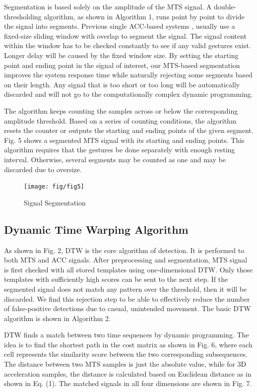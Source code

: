 Segmentation is based solely on the amplitude of the MTS
signal. A double-thresholding algorithm, as shown in Algorithm
1, runs point by point to divide the signal into segments.
Previous single ACC-based systems \cite{c13}, \cite{c14} usually use a
fixed-size sliding window with overlap to segment the signal.
The signal content within the window has to be checked
constantly to see if any valid gestures exist. Longer delay will
be caused by the fixed window size. By setting the starting
point and ending point in the signal of interest, our MTS-based
segmentation improves the system response time while
naturally rejecting some segments based on their length. Any
signal that is too short or too long will be automatically
discarded and will not go to the computationally complex
dynamic programming.

The algorithm keeps counting the samples across or below
the corresponding amplitude threshold. Based on a series of
counting conditions, the algorithm resets the counter or outputs
the starting and ending points of the given segment. Fig. 5
shows a segmented MTS signal with its starting and ending
points. This algorithm requires that the gestures be done
separately with enough resting interval. Otherwise, several
segments may be counted as one and may be discarded due to
oversize.

\begin{figure}[t]
\centering
\texttt{[image: fig/fig5]}
\caption{Signal Segmentation}
\end{figure}

\subsection{Dynamic Time Warping Algorithm}
As shown in Fig. 2, DTW is the core algorithm of detection.
It is performed to both MTS and ACC signals. After
preprocessing and segmentation, MTS signal is first checked
with all stored templates using one-dimensional DTW. Only
those templates with sufficiently high scores can be sent to
the next step. If the segmented signal does not match any
pattern over the threshold, then it will be discarded. We find
this rejection step to be able to effectively reduce the number of
false-positive detections due to casual, unintended movement.
The basic DTW algorithm is shown in Algorithm 2.

DTW finds a match between two time sequences by dynamic
programming. The idea is to find the shortest path in the
cost matrix as shown in Fig. 6, where each cell represents the
similarity score between the two corresponding subsequences.
The distance between two MTS samples is just the absolute
value, while for 3D acceleration samples, the distance is
calculated based on Euclidean distance as in shown in Eq. (1).
The matched signals in all four dimensions are shown in Fig. 7.

